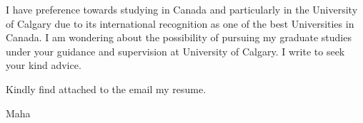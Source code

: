 \documentclass{article}
\begin{document}
I have preference towards studying in Canada and particularly in the University of Calgary due to its international recognition as one of the best Universities in Canada. I am wondering about the possibility of pursuing my graduate studies under your guidance and supervision at University of Calgary. I write to seek your kind advice.

Kindly find attached to the email my resume.


Maha
\end{document}
